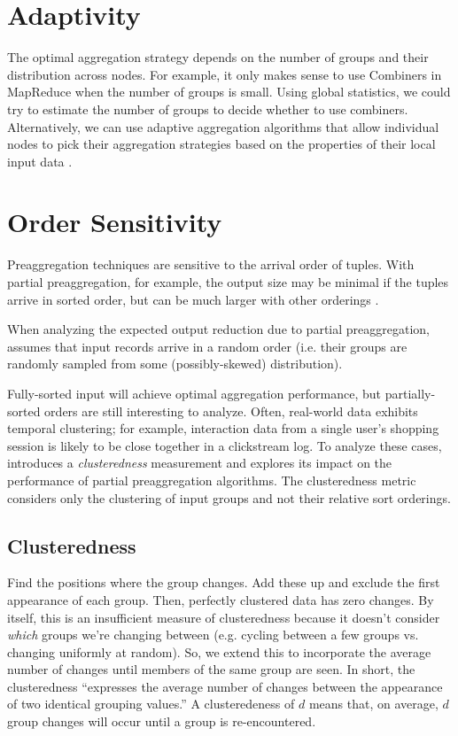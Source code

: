 \documentclass[12pt]{article}
\begin{document}
\section{Adaptivity}

The optimal aggregation strategy depends on the number of groups and their
distribution across nodes.
For example, it only makes sense to use Combiners in MapReduce when the number of groups is small.
Using global statistics, we could try to estimate the number of groups to decide whether to use combiners.
Alternatively, we can use adaptive aggregation algorithms that allow individual nodes to pick their aggregation strategies based on the properties of their local input data \cite{adaptive-aggregation}.

\section{Order Sensitivity}
Preaggregation techniques are sensitive to the arrival order of tuples.  With partial preaggregation, for example, the output size may be minimal if the tuples arrive in sorted order, but can be much larger with other orderings \cite{partial-preaggregation}.

When analyzing the expected output reduction due to partial preaggregation, \cite{partial-preaggregation} assumes that input records arrive in a random order (i.e. their groups are randomly sampled from some (possibly-skewed) distribution).

Fully-sorted input will achieve optimal aggregation performance, but partially-sorted orders are still interesting to analyze.  Often, real-world data exhibits temporal clustering; for example, interaction data from a single user's shopping session is likely to be close together in a clickstream log.  To analyze these cases, \cite{estimating-cardinality} introduces a \emph{clusteredness} measurement and explores its impact on the performance of partial preaggregation algorithms.  The clusteredness metric considers only the clustering of input groups and not their relative sort orderings.

\subsection{Clusteredness}

Find the positions where the group changes.  Add these up and exclude the first appearance of each group.  Then, perfectly clustered data has zero changes.  By itself, this is an insufficient measure of clusteredness because it doesn't consider \emph{which} groups we're changing between (e.g. cycling between a few groups vs. changing uniformly at random).  So, we extend this to incorporate the average number of changes until members of the same group are seen.  In short, the clusteredness ``expresses the average number of changes between the appearance of two identical grouping values.''  A clusteredeness of $d$ means that, on average, $d$ group changes will occur until a group is re-encountered.
\end{document}

